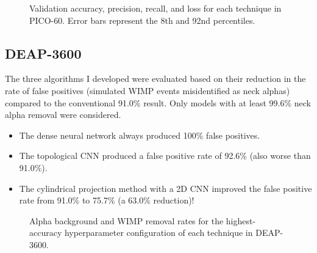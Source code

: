 \documentclass[12pt]{article}
\begin{document}
\begin{figure}[ht]
    \centering
    \caption{Validation accuracy, precision, recall, and loss for each technique in PICO-60. Error bars represent the 8th and 92nd percentiles.}
\end{figure}

\subsection{DEAP-3600}

The three algorithms I developed were evaluated based on their reduction in the rate of false positives (simulated WIMP events misidentified as neck alphas) compared to the conventional 91.0\% result. Only models with at least 99.6\% neck alpha removal were considered.

\begin{itemize}
    \item The dense neural network always produced 100\% false positives.
    \item The topological CNN produced a false positive rate of 92.6\% (also worse than 91.0\%).
    \item The cylindrical projection method with a 2D CNN improved the false positive rate from 91.0\% to 75.7\% (a 63.0\% reduction)!
\end{itemize}

\begin{figure}[ht]
    \centering
    \caption{Alpha background and WIMP removal rates for the highest-accuracy hyperparameter configuration of each technique in DEAP-3600.}
\end{figure}
\end{document}
